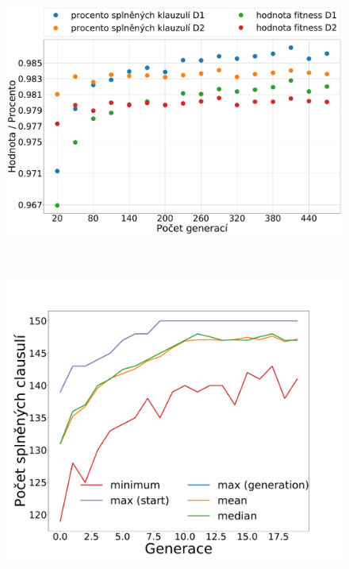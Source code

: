 \documentclass[11pt]{article}
\begin{document}
\begin{figure}
	\centering
	\begin{minipage}[c]{0.74\textwidth}
        \centering \includegraphics[width=\textwidth]{img/sat_gen_count.pdf} 
    \end{minipage}
    \\
    \begin{minipage}[c]{0.325\textwidth}
        \centering\includegraphics[width=\textwidth]{img/gc1p.pdf} 
    \end{minipage}
    \begin{minipage}[c]{0.325\textwidth}

\end{minipage}
\end{figure}
\end{document}
